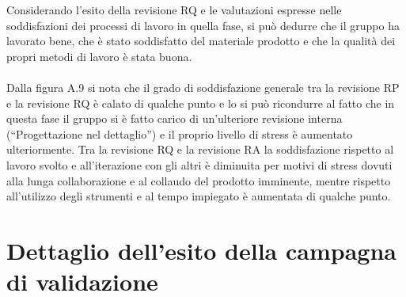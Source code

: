 Considerando l'esito della revisione RQ e le
valutazioni espresse nelle soddisfazioni dei processi di lavoro in quella
fase, si pu\`o dedurre che il gruppo ha lavorato bene, che \`e stato soddisfatto
del materiale prodotto e che la qualit\`a dei propri metodi di lavoro \`e stata
buona. \\ \\ 
Dalla figura A.9 si nota che il grado di soddisfazione generale tra la revisione
RP e la revisione RQ \`e calato di qualche punto e lo si pu\`o ricondurre al
fatto che in questa fase il gruppo si \`e fatto carico di un'ulteriore
revisione interna (``Progettazione nel dettaglio'') e il proprio livello di
stress \`e aumentato ulteriormente. Tra la revisione RQ e la revisione RA la
soddisfazione rispetto al lavoro svolto e all'iterazione con gli altri \`e
diminuita per motivi di stress dovuti alla lunga collaborazione e al
collaudo del prodotto imminente, mentre rispetto
all'utilizzo degli strumenti e al tempo impiegato \`e aumentata di qualche
punto.


\chapter{Dettaglio dell'esito della campagna di validazione}
\thispagestyle{fancy}

